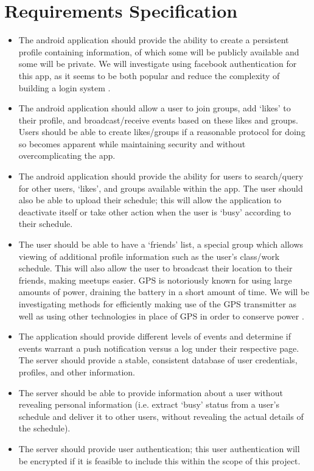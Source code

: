 \documentclass[11pt]{article}
\begin{document}
\section{Requirements Specification}

\begin{itemize}
\item The android application should provide the ability to create a persistent 
profile containing information, of which some will be publicly available and some 
will be private. We will investigate using facebook authentication 
for this app, as it seems to be both popular and reduce the complexity of 
building a login system \cite{capstone_facebook}.

\item The android application should allow a user to join groups, add `likes' to 
their profile, and broadcast/receive events based on these likes and groups. 
Users should be able to create likes/groups if a reasonable protocol for doing
so becomes apparent while maintaining security and without overcomplicating
the app.

\item The android application should provide the ability for users to search/query 
for other users, `likes', and groups available within the app. The user should 
    also be able to upload their schedule; this will allow the application to 
    deactivate itself or take other action when the user is `busy' according to
    their schedule.

\item The user should be able to have a `friends' list, a special group which allows 
viewing of additional profile information such as the user's class/work 
schedule. This will also allow the user to broadcast their location to their 
friends, making meetups easier. GPS is notoriously known for using large amounts 
of power, draining the battery in a short amount of time. We will be investigating
methods for efficiently making use of the GPS transmitter as well as using 
other technologies in place of GPS in order to conserve power \cite{conserve_gps} \cite{gps_alternatives}.

\item The application should provide different levels of events and determine if 
events warrant a push notification versus a log under their respective page.
The server should provide a stable, consistent database of user credentials, 
profiles, and other information.

\item The server should be able to provide information about a user without revealing 
personal information (i.e. extract `busy' status from a user's schedule and 
deliver it to other users, 
without revealing the actual details of the schedule).

\item The server should provide user authentication; this user authentication will 
be encrypted if it is feasible to include this within the scope of this project.
\end{itemize}
\end{document}
